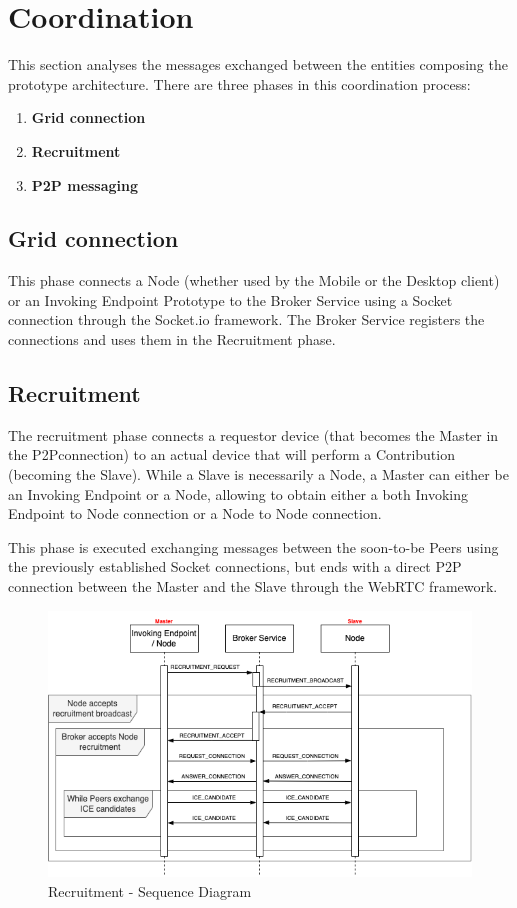 \section{Coordination}\label{coordination}
This section analyses the messages exchanged between the entities composing the prototype architecture. There are three phases in this coordination process:
\begin{enumerate}
    \item \textbf{Grid connection}
    \item \textbf{Recruitment}
    \item \textbf{P2P messaging}
\end{enumerate}

\subsection{Grid connection}
This phase connects a Node (whether used by the Mobile or the Desktop client) or an Invoking Endpoint Prototype to the Broker Service using a Socket connection through the Socket.io framework. The Broker Service registers the connections and uses them in the Recruitment phase.

\subsection{Recruitment}
The recruitment phase connects a requestor device (that becomes the Master in the P2Pconnection) to an actual device that will perform a Contribution (becoming the Slave). While a Slave is necessarily a Node, a Master can either be an Invoking Endpoint or a Node, allowing to obtain either a both Invoking Endpoint to Node connection or a Node to Node connection.

This phase is executed exchanging messages between the soon-to-be Peers using the previously established Socket connections, but ends with a direct P2P connection between the Master and the Slave through the WebRTC framework.

\begin{figure}[!ht]
    \centering
    \includegraphics[scale=0.65]{document/chapters/chapter_7/images/recruitment_messages.png}
    \caption{Recruitment - Sequence Diagram}
    \label{fig:recruitment_messages}
\end{figure}

